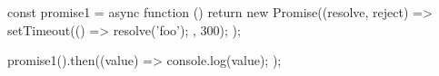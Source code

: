 const promise1 = async function (){
    return new Promise((resolve, reject) => {
        setTimeout(() => {
            resolve('foo');
        }, 300);
    });
}

promise1().then((value) => {
    console.log(value);
});